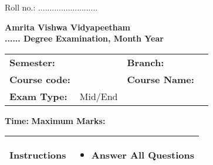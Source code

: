 \documentclass[12pt,a4paper]{article}
\author{Jinesh M.K}
\begin{document}
\begin{flushright}
Roll no.: ..........................
\end{flushright}
\begin{center}
{\bf Amrita Vishwa Vidyapeetham}\\

{\bf ...... Degree Examination, Month Year}\\



\end{center}


\begin{table}[h!]
\begin{tabular}{p{}p{}p{}p{}}

\textbf{Semester:}    &                  & \textbf{Branch:}         &  \\ 
\textbf{Course code:} &         & \textbf{Course Name:}    &  \\ 
\textbf{Exam Type:}    & Mid/End & \textbf{}               &  \\ 

\end{tabular}
\end{table}
\textbf{Time:} \hfill \textbf{Maximum Marks:}

\begin{table}[h!]
\begin{tabular}{|p{}|p{}|}
\hline

\textbf{Instructions} & \vspace*{-1em} \begin{itemize}
\item Answer All Questions
\end{itemize}
 \\
\hline
\end{tabular}
\end{table}
\end{document}
